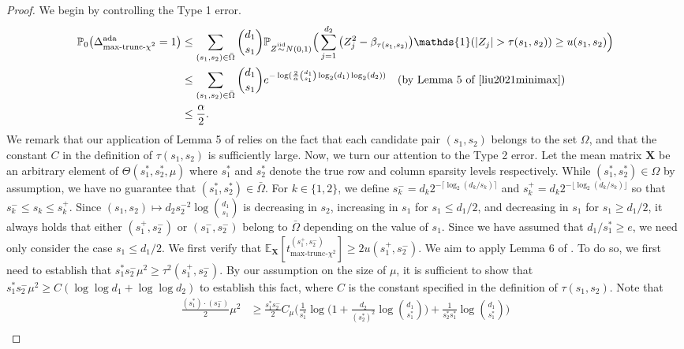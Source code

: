 \documentclass{article}
\newcommand{\bbP}{\mathbb{P}}
\newcommand{\EE}{\mathbb{E}}
\newcommand{\one}{\mathds{1}}
\newcommand{\iid}{\overset{\textrm{iid}}{\sim}}
\newcommand{\chisqmax}{\text{max-trunc-$\chi^2$}}
\theoremstyle{remark}
\begin{document}
\begin{proof}
    We begin by controlling the Type 1 error.
    \begin{align*}
\bbP_0\big(\Delta^{\text{ada}}_{\chisqmax} = 1\big) &\leq \sum_{(s_1, s_2) \in \bar{\Omega}} {d_1 \choose s_1}\bbP_{Z \iid N(0,1)}\Big(\sum_{j = 1}^{d_2}\big(Z^2_{j} - \beta_{\tau(s_1,s_2)}\big)\one(|Z_j| > \tau(s_1, s_2)) \geq u(s_1, s_2)\Big) \\
    &\leq \sum_{(s_1, s_2) \in \bar{\Omega}} {d_1 \choose s_1}e^{-\log(\frac{2}{\alpha}{d_1\choose s_1}\log_2(d_1)\log_2(d_2))} \quad \text{(by Lemma 5 of \cite{liu2021minimax})} \\
    &\leq \frac{\alpha}{2}.
    \end{align*}
    We remark that our application of Lemma 5 of \cite{liu2021minimax} relies on the fact that each candidate pair $(s_1, s_2)$ belongs to the set $\Omega$, and that the constant $C$ in the definition of $\tau(s_1, s_2)$ is sufficiently large. Now, we turn our attention to the Type 2 error. Let the mean matrix $\mathbf{X}$ be an arbitrary element of $\Theta(s^*_1, s^*_2, \mu)$ where $s^*_1$ and $s^*_2$ denote the true row and column sparsity levels respectively. While $(s_1^*, s_2^*) \in \Omega$ by assumption, we have no guarantee that $(s_1^*, s_2^*) \in \bar{\Omega}$. For $k \in \{1, 2\}$, we define $s_k^{-} = d_k 2^{-\lceil \log_2(d_k/s_k) \rceil}$ and $s_k^{+} = d_k 2^{-\lfloor \log_2(d_k/s_k) \rfloor}$ so that $s_k^{-} \leq s_k \leq s_k^{+}$. Since $(s_1, s_2) \mapsto d_2s_2^{-2}\log {d_1 \choose s_1}$ is decreasing in $s_2$, increasing in $s_1$ for $s_1 \leq d_1/2$, and decreasing in $s_1$ for $s_1 \geq d_1/2$, it always holds that either $(s_1^{+}, s_2^{-})$ or $(s_1^{-}, s_2^{-})$ belong to $\bar{\Omega}$ depending on the value of $s_1$. Since we have assumed that $d_1 / s_1^* \geq e$, we need only consider the case $s_1 \leq d_1/2$. We first verify that $\EE_{\mathbf{X}}[t^{(s_1^+, s_2^-)}_{\chisqmax}] \geq 2 u(s_1^+, s_2^-)$. We aim to apply Lemma 6 of \cite{liu2021minimax}. To do so, we first need to establish that $s_1^* s_2^{-}\mu^2 \geq \tau^2(s_1^+, s_2^-)$. By our assumption on the size of $\mu$, it is sufficient to show that $s_1^* s_2^{-}\mu^2 \geq C(\log \log d_1 + \log \log d_2)$ to establish this fact, where $C$ is the constant specified in the definition of $\tau(s_1, s_2)$. Note that
\begin{align*}
     \frac{(s_1^*)\cdot (s_2^-)}{2}\mu^2 &\geq \frac{s_1^*s_2^-}{2}C_\mu\Bigg(\frac{1}{s^*_1}\log\Big(1 + \frac{d_2}{(s^*_2)^2}\log {d_1 \choose s^*_1}\Big) + \frac{1}{s^*_2s^*_1}\log {d_1 \choose s^*_1}\Bigg) \\

\end{align*}
\end{proof}
\end{document}

